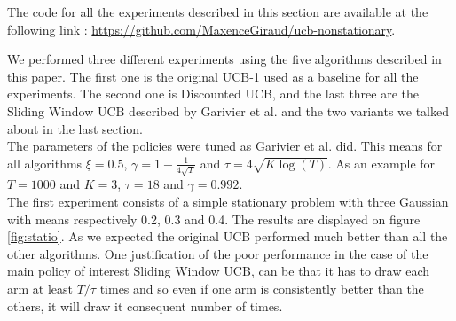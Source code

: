 The code for all the experiments described in this section are available at the following link : \url{https://github.com/MaxenceGiraud/ucb-nonstationary}.

We performed three different experiments using the five algorithms described in this paper. The first one is the original UCB-1 used as a baseline for all the experiments. The second one is Discounted UCB, and the last three are the Sliding Window UCB described by Garivier et al. \cite{garivier2008upperconfidence} and the two variants we talked about in the last section.\\
The parameters of the policies were tuned as Garivier et al. did. This means for all algorithms $\xi = 0.5$, $\gamma = 1 - \frac{1}{4\sqrt{T}}$ and $\tau = 4 \sqrt{K \log(T)}$. As an example for $T=1000$ and $K=3$, $\tau = 18$ and $\gamma = 0.992$.\\

The first experiment consists of a simple stationary problem with three Gaussian with means respectively 0.2, 0.3 and 0.4. The results are displayed on figure \ref{fig:statio}. As we expected the original UCB performed much better than all the other algorithms. One justification of the poor performance in the case of the main policy of interest Sliding Window UCB, can be that it has to draw each arm at least $T/\tau$ times and so even if one arm is consistently better than the others, it will draw it consequent number of times.\\

